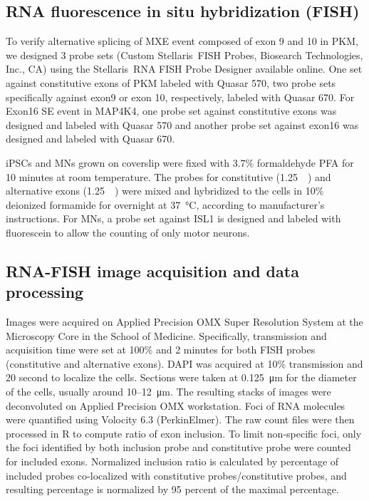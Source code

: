 \subsection{RNA fluorescence in situ hybridization (FISH)}

To verify alternative splicing of MXE event composed of exon 9 and 10 in PKM, we designed 3 probe sets (Custom Stellaris\textregistered\, FISH Probes, Biosearch Technologies, Inc., CA) using the Stellaris\textregistered\, RNA FISH Probe Designer available online. One set against constitutive exons of PKM labeled with Quasar 570, two probe sets specifically against exon9 or exon 10, respectively, labeled with Quasar 670. For Exon16 SE event in MAP4K4, one probe set against constitutive exons was designed and labeled with Quasar 570 and another probe set against exon16 was designed and labeled with Quasar 670.

iPSCs and MNs grown on coverslip were fixed with 3.7\% formaldehyde PFA for 10 minutes at room temperature. The probes for constitutive (\SI{1.25}{\micro\Molar}) and alternative exons (\SI{1.25}{\micro\Molar}) were mixed and hybridized to the cells in 10\% deionized formamide for overnight at \SI{37}{\degreeCelsius}, according to manufacturer’s instructions. For MNs, a probe set against ISL1 is designed and labeled with fluorescein to allow the counting of only motor neurons. 

\subsection{RNA-FISH image acquisition and data processing}

Images were acquired on Applied Precision OMX Super Resolution System at the Microscopy Core in the School of Medicine. Specifically, transmission and acquisition time were set at 100\% and 2 minutes for both FISH probes (constitutive and alternative exons). DAPI was acquired at 10\% transmission and 20 second to localize the cells. Sections were taken at \SI{0.125}{\micro\meter} for the diameter of the cells, usually around \numrange[range-phrase = --]{10}{12}\SI{}{\micro\meter}. The resulting stacks of images were deconvoluted on Applied Precision OMX workstation. Foci of RNA molecules were quantified using Volocity 6.3 (PerkinElmer). The raw count files were then processed in R to compute ratio of exon inclusion. To limit non-specific foci, only the foci identified by both inclusion probe and constitutive probe were counted for included exons. Normalized inclusion ratio is calculated by percentage of included probes co-localized with constitutive probes/constitutive probes, and resulting percentage is normalized by 95 percent of the maximal percentage.


